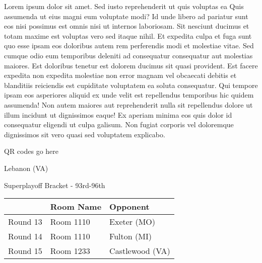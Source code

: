 \documentclass{article}%
\begin{document}
\vspace*{8pt}%
\linebreak%
\newline%
\newline%
Lorem ipsum dolor sit amet. Sed iusto reprehenderit ut quis voluptas ea Quis assumenda ut eius magni eum voluptate modi? Id unde libero ad pariatur sunt eos nisi possimus est omnis nisi ut internos laboriosam. Sit nesciunt ducimus et totam maxime est voluptas vero sed itaque nihil. Et expedita culpa et fuga sunt quo esse ipsam eos doloribus autem rem perferendis modi et molestiae vitae.\newline%
\newline%
Sed cumque odio eum temporibus deleniti ad consequatur consequatur aut molestias maiores. Est doloribus tenetur est dolorem ducimus sit quasi provident. Est facere expedita non expedita molestiae non error magnam vel obcaecati debitis et blanditiis reiciendis est cupiditate voluptatem ea soluta consequatur. Qui tempore ipsam eos asperiores aliquid ex unde velit est repellendus temporibus hic quidem assumenda!\newline%
\newline%
Non autem maiores aut reprehenderit nulla sit repellendus dolore ut illum incidunt ut dignissimos eaque! Ex aperiam minima eos quis dolor id consequatur eligendi ut culpa galisum. Non fugiat corporis vel doloremque dignissimos sit vero quasi sed voluptatem explicabo.\newline%
\newline%
%
\vspace*{30pt}%
\begin{center}%
\begin{Huge}%
QR codes go here%
\end{Huge}%
\end{center}%
\newpage%
\begin{center}%
\begin{Huge}%
Lebanon (VA)%
\end{Huge}%
\vspace*{8pt}%
\linebreak%
\begin{Large}%
Superplayoff Bracket {-} 93rd{-}96th%
\end{Large}%
\end{center}%
%
\begin{tabularx}{\textwidth}{|c|Y|Y|}%
\hline%
&Room Name&Opponent\\%
\hline%
Round 13&Room 1110&Exeter (MO)\\%
Round 14&Room 1110&Fulton (MI)\\%
Round 15&Room 1233&Castlewood (VA)\\%
\hline%
\end{tabularx}%
\end{document}
